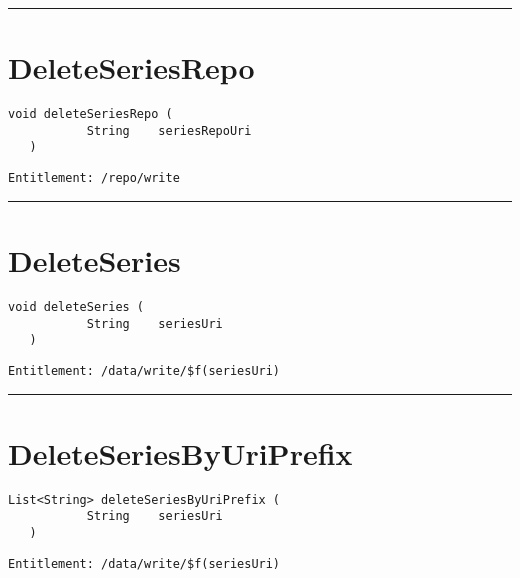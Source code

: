\rule{12cm}{2pt}
\section{DeleteSeriesRepo}
\label{Api:DeleteSeriesRepo}
\begin{lstlisting}[style=nonumbers]
   void deleteSeriesRepo (
           String    seriesRepoUri
   )
\end{lstlisting}
\begin{Verbatim}[formatcom=\color{Maroon}]
  Entitlement: /repo/write
\end{Verbatim}



\rule{12cm}{2pt}
\section{DeleteSeries}
\label{Api:DeleteSeries}
\begin{lstlisting}[style=nonumbers]
   void deleteSeries (
           String    seriesUri
   )
\end{lstlisting}
\begin{Verbatim}[formatcom=\color{Maroon}]
  Entitlement: /data/write/$f(seriesUri)
\end{Verbatim}



\rule{12cm}{2pt}
\section{DeleteSeriesByUriPrefix}
\label{Api:DeleteSeriesByUriPrefix}
\begin{lstlisting}[style=nonumbers]
   List<String> deleteSeriesByUriPrefix (
           String    seriesUri
   )
\end{lstlisting}
\begin{Verbatim}[formatcom=\color{Maroon}]
  Entitlement: /data/write/$f(seriesUri)
\end{Verbatim}



